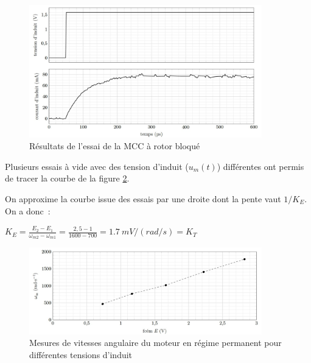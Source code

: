 \ifprof\else
\begin{figure}[!htb]
\begin{center}
\includegraphics[width=0.9\textwidth]{images/image_fig9.jpg}
\caption{Résultats de l’essai de la MCC à rotor bloqué \label{fig9}}
\end{center}
\end{figure}


Plusieurs essais à vide avec des tension d'induit ($u_m(t)$) différentes ont permis de tracer la courbe de la
figure \ref{fig12}.
\fi

\ifprof
\begin{corrige}
On approxime la courbe issue des essais par une droite dont la pente
  vaut \(1/K_{E}\). On a donc~:


\(K_{E} = \frac{E_{2} - E_{1}}{\omega_{m2} - \omega_{m1}} = \frac{2,5 - 1}{1600 - 700} = \SI{1,7}{mV/(rad/s)}=K_T\)
\end{corrige}
\else
\fi

\ifprof\else
\begin{figure}[!htb]
\begin{center}
\includegraphics[width=0.9\textwidth]{images/image_fig12.jpg}
\caption{Mesures de vitesses angulaire du moteur en régime permanent pour différentes tensions d’induit \label{fig12}}
\end{center}
\end{figure}
\fi

